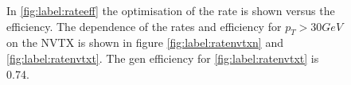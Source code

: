 \begin{figure}
\hfill
{}
\hfill
{}
\centering
{}
\caption{In \ref{fig:label:rateeff} the optimisation of the rate is shown versus the efficiency. The dependence of the rates and efficiency for $p_T > 30 GeV$ on the NVTX is shown in figure \ref{fig:label:ratenvtxn} and \ref{fig:label:ratenvtxt}. The gen efficiency for \ref{fig:label:ratenvtxt} is 0.74.}
\label{fig:label:rates}
\end{figure}
